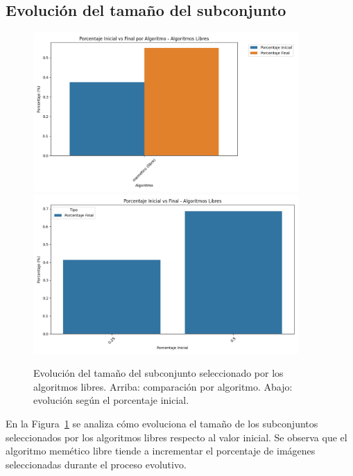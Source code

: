 \subsection{Evolución del tamaño del subconjunto}
\begin{figure}[htp]
    \centering
    \includegraphics[width=0.9\textwidth]{imagenes/evaluaciones/painting/porcentaje-inical-vs-final-por-algoritmo}
    \vspace{1em}
    \includegraphics[width=0.9\textwidth]{imagenes/evaluaciones/painting/porcentaje-inicial-vs-final-por-pi}
    \caption{Evolución del tamaño del subconjunto seleccionado por los algoritmos libres.
        Arriba: comparación por algoritmo.
        Abajo: evolución según el porcentaje inicial.
    }
    \label{fig:evolucion_porcentaje_libre}
\end{figure}

En la Figura~\ref{fig:evolucion_porcentaje_libre} se analiza cómo evoluciona el tamaño de los subconjuntos seleccionados por los algoritmos libres respecto al valor inicial.
Se observa que el algoritmo memético libre tiende a incrementar el porcentaje de imágenes seleccionadas durante el proceso evolutivo.

